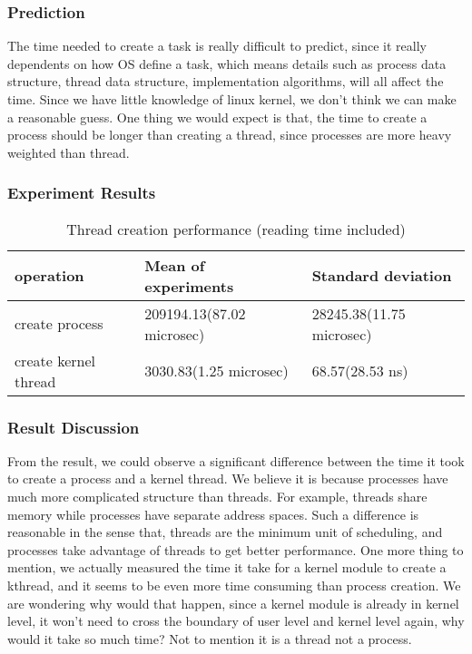 \documentclass{article} %
\begin{document}
\subsubsection{Prediction}
The time needed to create a task is really difficult to predict, since it
really dependents on how OS define a task, which means details such as process
data structure, thread data structure, implementation algorithms, will all
affect the time. Since we have little knowledge of linux kernel, we don't
think we can make a reasonable guess. One thing we would expect is that, the
time to create a process should be longer than creating a thread, since
processes are more heavy weighted than thread.

\subsubsection{Experiment Results}
\begin{table}[h]
  \begin{center}
    \caption{Thread creation performance (reading time included)}
    \begin{tabular}{|l|l|l|}
      \hline
      operation            & Mean of experiments       & Standard deviation       \\ \hline
      create process       & 209194.13(87.02 microsec) & 28245.38(11.75 microsec) \\ \hline
      create kernel thread & 3030.83(1.25 microsec)    & 68.57(28.53 ns)          \\ \hline
    \end{tabular}
    \label{table:thread_creating_results}
  \end{center}
\end{table}


\subsubsection{Result Discussion}
From the result, we could observe a significant difference between the time it
took to create a process and a kernel thread. We believe it is because
processes have much more complicated structure than threads. For example,
threads share memory while processes have separate address spaces. Such
a difference is reasonable in the sense that, threads are the minimum unit of
scheduling, and processes take advantage of threads to get better performance.
One more thing to mention, we actually measured the time it take for a kernel
module to create a kthread, and it seems to be even more time consuming than
process creation. We are wondering why would that happen, since a kernel
module is already in kernel level, it won't need to cross the boundary of user
level and kernel level again, why would it take so much time? Not to mention
it is a thread not a process.
\end{document}
